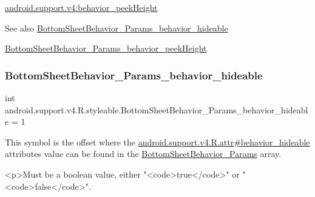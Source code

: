 {\ttfamily \hyperlink{classandroid_1_1support_1_1v4_1_1R_1_1styleable_a263c5bb11a9f89389416857ef1b21c5d}{android.\+support.\+v4\+:behavior\+\_\+peek\+Height}}

\begin{DoxySeeAlso}{See also}
\hyperlink{classandroid_1_1support_1_1v4_1_1R_1_1styleable_aa0e0b1fe9eb8320ac0c20a9fdd74f3f9}{Bottom\+Sheet\+Behavior\+\_\+\+Params\+\_\+behavior\+\_\+hideable} 

\hyperlink{classandroid_1_1support_1_1v4_1_1R_1_1styleable_a263c5bb11a9f89389416857ef1b21c5d}{Bottom\+Sheet\+Behavior\+\_\+\+Params\+\_\+behavior\+\_\+peek\+Height} 
\end{DoxySeeAlso}
\mbox{\label{classandroid_1_1support_1_1v4_1_1R_1_1styleable_aa0e0b1fe9eb8320ac0c20a9fdd74f3f9}} 
\subsubsection{\texorpdfstring{Bottom\+Sheet\+Behavior\+\_\+\+Params\+\_\+behavior\+\_\+hideable}{BottomSheetBehavior\_Params\_behavior\_hideable}}
{\footnotesize\ttfamily int android.\+support.\+v4.\+R.\+styleable.\+Bottom\+Sheet\+Behavior\+\_\+\+Params\+\_\+behavior\+\_\+hideable = 1\hspace{0.3cm}{\ttfamily [static]}}

This symbol is the offset where the \hyperlink{classandroid_1_1support_1_1v4_1_1R_1_1attr_a4743a5bd4c43bcfe955c9904fe16c93e}{android.\+support.\+v4.\+R.\+attr\#behavior\+\_\+hideable} attribute\textquotesingle{}s value can be found in the \hyperlink{classandroid_1_1support_1_1v4_1_1R_1_1styleable_aeef0bb6121e7d6065d53100656871173}{Bottom\+Sheet\+Behavior\+\_\+\+Params} array.

\begin{DoxyVerb}      <p>Must be a boolean value, either "<code>true</code>" or "<code>false</code>".
\end{DoxyVerb}
 

